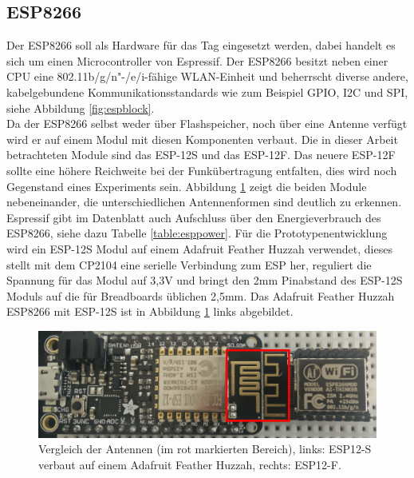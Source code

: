 \subsection{ESP8266}
Der ESP8266 soll als Hardware für das Tag eingesetzt werden, dabei handelt es sich um einen Microcontroller von Espressif.
Der ESP8266 besitzt neben einer CPU eine 802.11b/g/n"-/e/i-fähige WLAN-Einheit und beherrscht diverse andere, kabelgebundene Kommunikationsstandards wie zum Beispiel GPIO, I2C und SPI, siehe Abbildung \ref{fig:espblock}. \\
Da der ESP8266 selbst weder über Flashspeicher, noch über eine Antenne verfügt wird er auf einem Modul mit diesen Komponenten verbaut. 
Die in dieser Arbeit betrachteten Module sind das ESP-12S und das ESP-12F.
Das neuere ESP-12F sollte eine höhere Reichweite bei der Funkübertragung entfalten, dies wird noch Gegenstand eines Experiments sein.
Abbildung \ref{fig:espmodules} zeigt die beiden Module nebeneinander, die unterschiedlichen Antennenformen sind deutlich zu erkennen.\\
Espressif gibt im Datenblatt auch Aufschluss über den Energieverbrauch des ESP8266, siehe dazu Tabelle \ref{table:esppower}.
Für die Prototypenentwicklung wird ein ESP-12S Modul auf einem Adafruit Feather Huzzah verwendet, dieses stellt mit dem CP2104 eine serielle Verbindung zum ESP her, reguliert die Spannung für das Modul auf 3,3V und bringt den 2mm Pinabstand des ESP-12S Moduls auf die für Breadboards üblichen 2,5mm.
Das Adafruit Feather Huzzah ESP8266 mit ESP-12S ist in Abbildung \ref{fig:espmodules} links abgebildet.

\begin{figure}[h]
  \centering
	\includegraphics[width=\textwidth]{images/espmodules.png}
  \caption{Vergleich der Antennen (im rot markierten Bereich), links: ESP12-S verbaut auf einem Adafruit Feather Huzzah, rechts: ESP12-F.}
  \label{fig:espmodules}
\end{figure}

